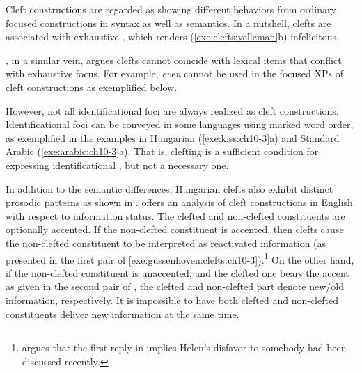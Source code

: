 Cleft constructions are regarded as showing different behaviors from
ordinary focused constructions in syntax as well as semantics. In a
nutshell, clefts are associated with exhaustive , which renders
(\ref{exe:clefts:velleman}b) infelicitous.


\noindent \citet{kim:12a}, in a similar vein, argues clefts cannot
coincide with lexical items that conflict with exhaustive focus. For
example, \textit{even} cannot be used in the focused XPs of cleft
constructions as exemplified below.



\noindent However, not all identificational foci are always realized
as cleft constructions. Identificational foci can be
conveyed in some languages using marked word order, as exemplified in
the examples in Hungarian (\ref{exe:kiss:ch10-3}a) and Standard Arabic
(\ref{exe:arabic:ch10-3}a).  That is, clefting is a sufficient
condition for expressing identificational , but not a necessary
one.








In addition to the semantic differences, Hungarian clefts also 
exhibit distinct prosodic patterns as shown in .  
\citet{gussenhoven:07} offers an analysis of cleft
constructions in English with respect to information status.  The
clefted and non-clefted constituents are optionally accented.  If the
non-clefted constituent is accented, then clefts cause the non-clefted
constituent to be interpreted as reactivated information (as presented
in the first pair of
\ref{exe:gussenhoven:clefts:ch10-3}).\footnote{\citet{gussenhoven:07}
  argues that the first reply in
   implies Helen's disfavor
  to somebody had been discussed recently.}  On the other hand, if the
non-clefted constituent is unaccented, and the clefted one bears the
accent as given in the second pair of
, the clefted and
non-clefted part denote new/old information, respectively. It is
impossible to have both clefted and non-clefted constituents deliver
new information at the same time.

